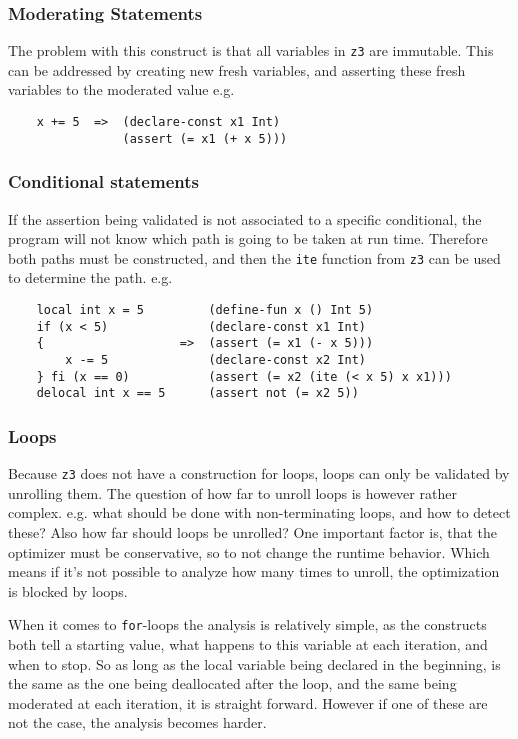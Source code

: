 \subsubsection*{Moderating Statements}
The problem with this construct is that all variables in \texttt{z3} are immutable. This can
be addressed by creating new fresh variables, and asserting these fresh variables to the moderated
value e.g.
\begin{verbatim}
    x += 5  =>  (declare-const x1 Int)
                (assert (= x1 (+ x 5)))
\end{verbatim}

\subsubsection*{Conditional statements}
If the assertion being validated is not associated to a specific conditional, the program will
not know which path is going to be taken at run time. Therefore both paths must be constructed,
and then the \texttt{ite} function from \texttt{z3} can be used to determine the path. e.g.
\begin{verbatim}
    local int x = 5         (define-fun x () Int 5)
    if (x < 5)              (declare-const x1 Int)
    {                   =>  (assert (= x1 (- x 5)))
        x -= 5              (declare-const x2 Int)
    } fi (x == 0)           (assert (= x2 (ite (< x 5) x x1)))
    delocal int x == 5      (assert not (= x2 5))
\end{verbatim}

\subsubsection*{Loops}
Because \texttt{z3} does not have a construction for loops, loops can only be validated by unrolling
them. The question of how far to unroll loops is however rather complex. e.g. what should be done
with non-terminating loops, and how to detect these? Also how far should loops be unrolled? One
important factor is, that the optimizer must be conservative, so to not change the runtime behavior.
Which means if it's not possible to analyze how many times to unroll, the optimization is blocked
by loops.

When it comes to \texttt{for}-loops the analysis is relatively simple, as the constructs both
tell a starting value, what happens to this variable at each iteration, and when to stop.
So as long as the local variable being declared in the beginning, is the same as the one being
deallocated after the loop, and the same being moderated at each iteration, it is straight forward.
However if one of these are not the case, the analysis becomes harder.

